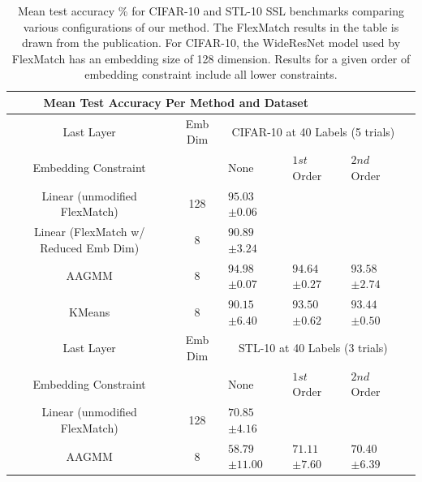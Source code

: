 \documentclass[10pt,twocolumn,letterpaper]{article}
\begin{document}
\begin{table}[ht!]
	\begin{tabularx}{\textwidth}{c|c|XXXX}
		\multicolumn{4}{c}{Mean Test Accuracy Per Method and Dataset} \\ \hline\hline
		Last Layer &   Emb Dim   & \multicolumn{3}{c}{CIFAR-10 at 40 Labels (5 trials)}            \\ 
		\hline
		Embedding Constraint  &  & None & $1st$ Order & $2nd$ Order\\ 
		\hline
		Linear (unmodified FlexMatch) & 128  & $95.03$ \scriptsize{$\pm 0.06$}   &  &  \\
		Linear (FlexMatch w/ Reduced Emb Dim) & 8  & $90.89$ \scriptsize{$\pm 3.24$}      &  & \\
		\hline
		AAGMM & 8  & $94.98$ \scriptsize{$\pm 0.07$}    & $94.64$ \scriptsize{$\pm 0.27$} & $93.58$ \scriptsize{$\pm 2.74$}  \\
		\hline
		KMeans & 8  & $90.15$ \scriptsize{$\pm 6.40$}    & $93.50$ \scriptsize{$\pm 0.62$} & $93.44$ \scriptsize{$\pm 0.50$}   \\
		
		\hline\hline
		Last Layer  &   Emb Dim  & \multicolumn{3}{c}{STL-10 at 40 Labels (3 trials)}            \\ 
		\hline
		\multicolumn{1}{c|}{Embedding Constraint} &  & None & $1st$ Order & $2nd$ Order  \\ 
		\hline
		Linear (unmodified FlexMatch) & 128  & $70.85$ \scriptsize{$\pm 4.16$}   &  &   \\
		\hline
		AAGMM & 8  & $58.79$ \scriptsize{$\pm 11.00$}    & $71.11$ \scriptsize{$\pm 7.60$} & $70.40$ \scriptsize{$\pm 6.39$}  \\
	\end{tabularx}
	\caption{Mean test accuracy \% for CIFAR-10 and STL-10 SSL benchmarks comparing various configurations of our method. The FlexMatch results in the table is drawn from the publication. For CIFAR-10, the WideResNet model used by FlexMatch has an embedding size of 128 dimension. Results for a given order of embedding constraint include all lower constraints.}
	\label{table1}
\end{table}

\end{document}
